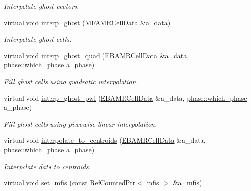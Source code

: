\begin{DoxyCompactItemize}
\begin{DoxyCompactList}\small\item\em Interpolate ghost vectors. \end{DoxyCompactList}\item 
virtual void \hyperlink{classamr__mesh_a123b307dbb76cbc5918031f5562168b2}{interp\+\_\+ghost} (\hyperlink{type__definitions_8H_aced885351d40daa466564acbee4042d3}{M\+F\+A\+M\+R\+Cell\+Data} \&a\+\_\+data)
\begin{DoxyCompactList}\small\item\em Interpolate ghost cells. \end{DoxyCompactList}\item 
virtual void \hyperlink{classamr__mesh_ae0f4283d0f9c04623658d1c562a8536c}{interp\+\_\+ghost\+\_\+quad} (\hyperlink{type__definitions_8H_a7e610f301989e5e07781c5e338bdb7c3}{E\+B\+A\+M\+R\+Cell\+Data} \&a\+\_\+data, \hyperlink{namespacephase_a23c76f548a5eb1955ed8c929c541108b}{phase\+::which\+\_\+phase} a\+\_\+phase)
\begin{DoxyCompactList}\small\item\em Fill ghost cells using quadratic interpolation. \end{DoxyCompactList}\item 
virtual void \hyperlink{classamr__mesh_a3c60e156eb18a82f82ffe7004db97070}{interp\+\_\+ghost\+\_\+pwl} (\hyperlink{type__definitions_8H_a7e610f301989e5e07781c5e338bdb7c3}{E\+B\+A\+M\+R\+Cell\+Data} \&a\+\_\+data, \hyperlink{namespacephase_a23c76f548a5eb1955ed8c929c541108b}{phase\+::which\+\_\+phase} a\+\_\+phase)
\begin{DoxyCompactList}\small\item\em Fill ghost cells using piecewise linear interpolation. \end{DoxyCompactList}\item 
virtual void \hyperlink{classamr__mesh_afca8b540d51d17e43b01588703abaf61}{interpolate\+\_\+to\+\_\+centroids} (\hyperlink{type__definitions_8H_a7e610f301989e5e07781c5e338bdb7c3}{E\+B\+A\+M\+R\+Cell\+Data} \&a\+\_\+data, \hyperlink{namespacephase_a23c76f548a5eb1955ed8c929c541108b}{phase\+::which\+\_\+phase} a\+\_\+phase)
\begin{DoxyCompactList}\small\item\em Interpolate data to centroids. \end{DoxyCompactList}\item 
virtual void \hyperlink{classamr__mesh_aacf9cdf43333205dd2025547fe9e5fab}{set\+\_\+mfis} (const Ref\+Counted\+Ptr$<$ \hyperlink{classmfis}{mfis} $>$ \&a\+\_\+mfis)

\end{DoxyCompactItemize}
